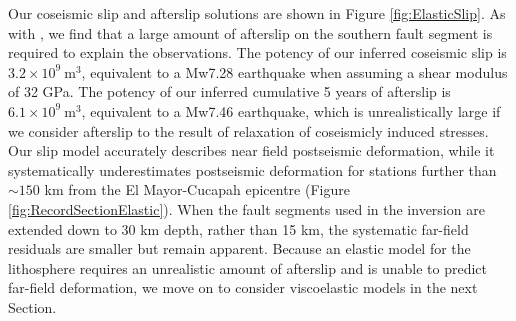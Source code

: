 \documentclass[1p]{elsarticle}
\begin{document}
Our coseismic slip and afterslip solutions are shown in Figure \ref{fig:ElasticSlip}.  As with \citet{Rollins2015}, we find that a large amount of afterslip on the southern fault segment is required to explain the observations. The potency of our inferred coseismic slip is $3.2\times10^9\ \mathrm{m}^3$, equivalent to a Mw7.28 earthquake when assuming a shear modulus of 32 GPa.  The potency of our inferred cumulative 5 years of afterslip is $6.1\times10^9\ \mathrm{m}^3$, equivalent to a Mw7.46 earthquake, which is unrealistically large if we consider afterslip to the result of relaxation of coseismicly induced stresses.  Our slip model accurately describes near field postseismic deformation, while it systematically underestimates postseismic deformation for stations further than $\sim150$ km from the El Mayor-Cucapah epicentre (Figure \ref{fig:RecordSectionElastic}).  When the fault segments used in the inversion are extended down to 30 km depth, rather than 15 km, the systematic far-field residuals are smaller but remain apparent. Because an elastic model for the lithosphere requires an unrealistic amount of afterslip and is unable to predict far-field deformation, we move on to consider viscoelastic models in the next Section.  
\end{document}
